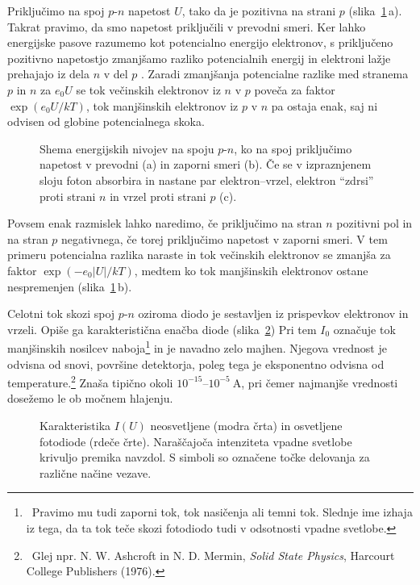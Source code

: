 Priključimo na spoj $p$-$n$ napetost $U$, tako da je pozitivna na strani $p$ (slika~\ref{11_PNU}\,a). 
Takrat pravimo, da smo napetost priključili v prevodni smeri.
Ker lahko energijske pasove razumemo kot potencialno energijo elektronov, 
s priključeno pozitivno napetostjo zmanjšamo razliko potencialnih energij 
in elektroni lažje prehajajo iz dela $n$ v del $p$ . 
Zaradi zmanjšanja potencialne razlike med stranema $p$ in $n$ za $e_0U$ se tok 
večinskih elektronov iz $n$ v $p$ poveča za faktor $\exp(e_0 U/kT)$, tok manjšinskih elektronov
iz $p$ v $n$ pa ostaja enak, saj ni odvisen od globine potencialnega skoka. 
\begin{figure}[ht]
\centering
\def\svgwidth{140truemm} 

\caption{Shema energijskih nivojev na spoju $p$-$n$, ko na spoj priključimo napetost
v prevodni (a) in zaporni smeri (b). Če se v izpraznjenem sloju foton absorbira 
in nastane par elektron--vrzel, elektron ``zdrsi'' proti strani $n$ in vrzel proti
strani $p$ (c).}
\label{11_PNU}
\end{figure}

Povsem enak razmislek lahko naredimo, če priključimo 
na stran $n$ pozitivni pol in na stran $p$ negativnega, če torej priključimo
napetost v zaporni smeri. V tem primeru potencialna razlika naraste in tok 
večinskih elektronov se zmanjša za faktor $\exp(-e_0 |U|/kT)$, medtem ko tok 
manjšinskih elektronov ostane nespremenjen (slika~\ref{11_PNU}\,b).

Celotni tok skozi spoj $p$-$n$ oziroma diodo je sestavljen iz prispevkov elektronov in vrzeli. Opiše ga
karakteristična enačba diode (slika~\ref{11_IU})
Pri tem $I_0$ označuje tok manjšinskih nosilcev naboja\footnote{~Pravimo
mu tudi zaporni tok, tok nasičenja ali temni tok. Slednje ime izhaja iz tega, da
ta tok teče skozi fotodiodo tudi v odsotnosti vpadne svetlobe.}
in je navadno zelo majhen. Njegova vrednost je odvisna od snovi, površine
detektorja, poleg tega je eksponentno odvisna od temperature.\footnote{~Glej npr. 
N. W. Ashcroft in N. D. Mermin, {\it Solid State Physics}, Harcourt College
Publishers (1976).} Znaša 
tipično okoli $10^{-15}$--$10^{-5}~\si{\ampere}$, pri čemer najmanjše
vrednosti dosežemo le ob močnem hlajenju.

\begin{figure}[ht]
\centering
\def\svgwidth{100truemm} 

\caption{Karakteristika $I(U)$  neosvetljene (modra črta)
in osvetljene fotodiode (rdeče črte). Naraščajoča intenziteta vpadne svetlobe
krivuljo premika navzdol. S simboli so označene točke delovanja za različne načine vezave.}
\label{11_IU}
\end{figure}
 
